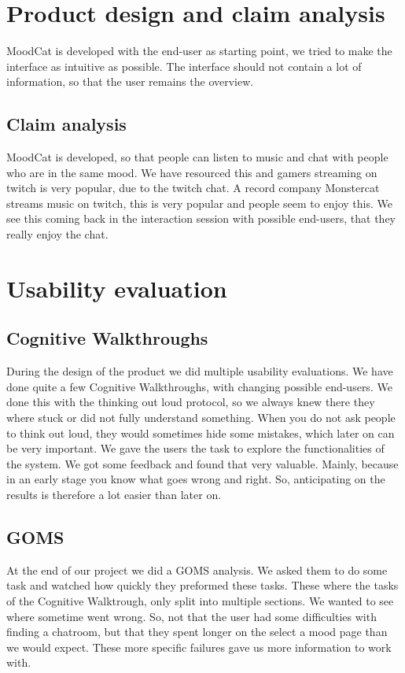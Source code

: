 
\section{Product design and claim analysis}
MoodCat is developed with the end-user as starting point, we tried to make the interface as intuitive as possible.
The interface should not contain a lot of information, so that the user remains the overview.

\subsection{Claim analysis}
MoodCat is developed, so that people can listen to music and chat with people who are in the same mood.
We have resourced this and gamers streaming on twitch is very popular, due to the twitch chat.
A record company Monstercat streams music on twitch, this is very popular and people seem to enjoy this.
We see this coming back in the interaction session with possible end-users, that they really enjoy the chat.


\section{Usability evaluation}
\subsection{Cognitive Walkthroughs}
During the design of the product we did multiple usability evaluations.
We have done quite a few Cognitive Walkthroughs, with changing possible end-users.
We done this with the thinking out loud protocol, so we always knew there they where stuck or did not fully understand something.
When you do not ask people to think out loud, they would sometimes hide some mistakes, which later on can be very important.
We gave the users the task to explore the functionalities of the system.
We got some feedback and found that very valuable.
Mainly, because in an early stage you know what goes wrong and right. 
So, anticipating on the results is therefore a lot easier than later on.
\subsection{GOMS}
At the end of our project we did a GOMS analysis.
We asked them to do some task and watched how quickly they preformed these tasks.
These where the tasks of the Cognitive Walktrough, only split into multiple sections.
We wanted to see where sometime went wrong. 
So, not that the user had some difficulties with finding a chatroom, but that they spent longer on the select a mood page than we would expect.
These more specific failures gave us more information to work with.

